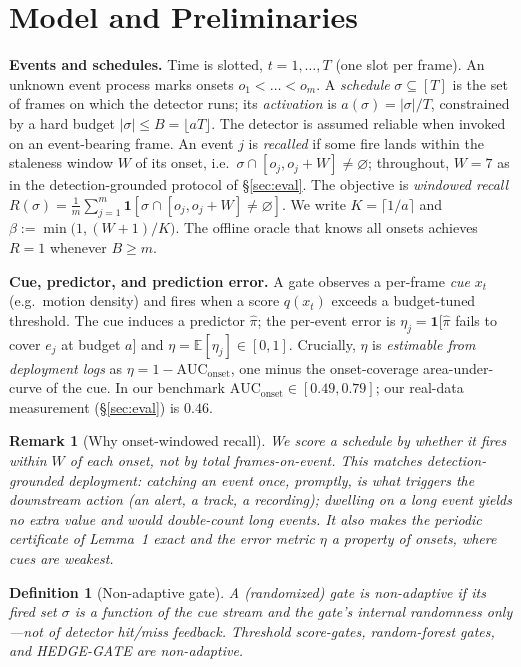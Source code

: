 ﻿\documentclass[lettersize,journal]{IEEEtran}
\newtheorem*{defn}{Definition}
\newtheorem*{rem}{Remark}
\begin{document}
\section{Model and Preliminaries}\label{sec:model}
\textbf{Events and schedules.} Time is slotted, $t=1,\dots,T$ (one slot per frame). An unknown event process marks onsets $o_1<\dots<o_m$. A \emph{schedule} $\sigma\subseteq[T]$ is the set of frames on which the detector runs; its \emph{activation} is $a(\sigma)=|\sigma|/T$, constrained by a hard budget $|\sigma|\le B=\lfloor aT\rfloor$. The detector is assumed reliable when invoked on an event-bearing frame. An event $j$ is \emph{recalled} if some fire lands within the staleness window $W$ of its onset, i.e.\ $\sigma\cap[o_j,o_j{+}W]\neq\varnothing$; throughout, $W=7$ as in the detection-grounded protocol of \S\ref{sec:eval}. The objective is \emph{windowed recall} $R(\sigma)=\tfrac1m\sum_{j=1}^m \mathbf 1[\sigma\cap[o_j,o_j{+}W]\neq\varnothing]$. We write $K=\lceil 1/a\rceil$ and $\beta:=\min\!\big(1,(W{+}1)/K\big)$. The offline oracle that knows all onsets achieves $R=1$ whenever $B\ge m$.

\textbf{Cue, predictor, and prediction error.} A gate observes a per-frame \emph{cue} $x_t$ (e.g.\ motion density) and fires when a score $q(x_t)$ exceeds a budget-tuned threshold. The cue induces a predictor $\hat\pi$; the per-event error is $\eta_j=\mathbf 1[\hat\pi$ fails to cover $e_j$ at budget $a]$ and $\eta=\mathbb E[\eta_j]\in[0,1]$. Crucially, $\eta$ is \emph{estimable from deployment logs} as $\eta=1-\mathrm{AUC}_{\text{onset}}$, one minus the onset-coverage area-under-curve of the cue. In our benchmark $\mathrm{AUC}_{\text{onset}}\in[0.49,0.79]$; our real-data measurement (\S\ref{sec:eval}) is $0.46$.

\begin{rem}[Why onset-windowed recall]
We score a schedule by whether it fires within $W$ of each \emph{onset}, not by total frames-on-event. This matches detection-grounded deployment: catching an event once, promptly, is what triggers the downstream action (an alert, a track, a recording); dwelling on a long event yields no extra value and would double-count long events. It also makes the periodic certificate of Lemma~1 exact and the error metric $\eta$ a property of \emph{onsets}, where cues are weakest.
\end{rem}

\begin{defn}[Non-adaptive gate]
A (randomized) gate is \emph{non-adaptive} if its fired set $\sigma$ is a function of the cue stream and the gate's internal randomness only---not of detector hit/miss feedback. Threshold score-gates, random-forest gates, and HEDGE-GATE are non-adaptive.
\end{defn}
\end{document}
